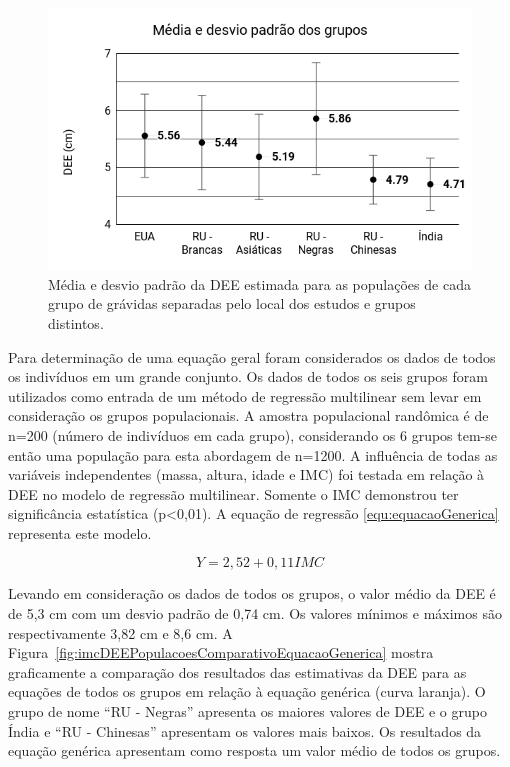 \begin{figure}[ht!]
    \centering
    \includegraphics[width=0.8\linewidth]{capitulos/figuras/Media e desvio padrao dos grupos.png} 
    \caption{Média e desvio padrão da \acrshort{DEE} estimada para as populações de cada grupo de grávidas separadas pelo local dos estudos e grupos distintos.}
    \label{fig:mediaDesvioPadraoPopulacoes}
\end{figure}

Para determinação de uma equação geral foram considerados os dados de todos os indivíduos em um grande conjunto. Os dados de todos os seis grupos foram utilizados como entrada de um método de regressão multilinear sem levar em consideração os grupos populacionais. A amostra populacional randômica é de n=200 (número de indivíduos em cada grupo), considerando os 6 grupos tem-se então uma população para esta abordagem de n=1200. A influência de todas as variáveis  independentes (massa, altura, idade e \acrshort{IMC}) foi testada em relação à \acrshort{DEE} no modelo de regressão multilinear. Somente o \acrshort{IMC} demonstrou ter significância estatística (p<0,01). A equação de regressão \ref{equ:equacaoGenerica} representa este modelo. 

\begin{equation}
\label{equ:equacaoGenerica}
Y=2,52+0,11 IMC
\end{equation}

Levando em consideração os dados de todos os grupos, o valor médio da \acrshort{DEE} é de 5,3 cm com um desvio padrão de 0,74 cm. Os valores mínimos e máximos são respectivamente 3,82 cm e 8,6 cm. A Figura~\ref{fig:imcDEEPopulacoesComparativoEquacaoGenerica} mostra graficamente a comparação dos resultados das estimativas da  \acrshort{DEE} para as equações de todos os grupos em relação à equação genérica (curva laranja). O grupo de nome ``RU - Negras'' apresenta os maiores valores de \acrshort{DEE} e o grupo Índia e ``RU - Chinesas'' apresentam os valores mais baixos. Os resultados da equação genérica apresentam como resposta um valor médio de todos os grupos.

